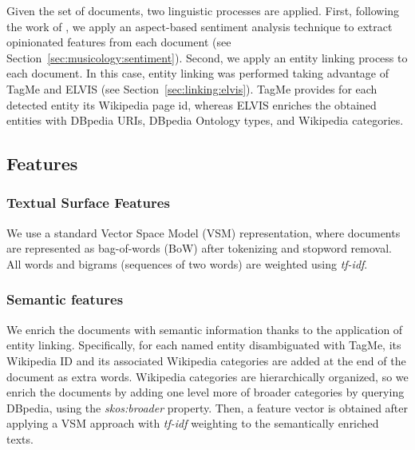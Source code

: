 Given the set of documents, two linguistic processes are applied. First, following the work of \cite{DongSOS13,DongOS14}, we apply an aspect-based sentiment analysis technique to extract opinionated features from each document (see Section~\ref{sec:musicology:sentiment}). Second, we apply an entity linking process to each document. In this case, entity linking was performed taking advantage of TagMe \citep{Ferragina2012} and ELVIS (see Section~\ref{sec:linking:elvis}). TagMe provides for each detected entity its Wikipedia page id, whereas ELVIS enriches the obtained entities with DBpedia URIs, DBpedia Ontology types, and Wikipedia categories.

\subsection{Features}
\label{sec:similarity:features}
\subsubsection{Textual Surface Features}
We use a standard Vector Space Model (VSM) representation, where documents are represented as bag-of-words (BoW) after tokenizing and stopword removal. All words and bigrams (sequences of two words) are weighted using \textit{tf-idf}. 

\subsubsection{Semantic features}

We enrich the documents with semantic information thanks to the application of entity linking. Specifically, for each named entity disambiguated with TagMe, its Wikipedia ID and its associated Wikipedia categories are added at the end of the document as extra words. Wikipedia categories are hierarchically organized, so we enrich the documents by adding one level more of broader categories by querying DBpedia, using the \textit{skos:broader} property.
Then, a feature vector is obtained after applying a VSM approach with \textit{tf-idf} weighting to the semantically enriched texts.

